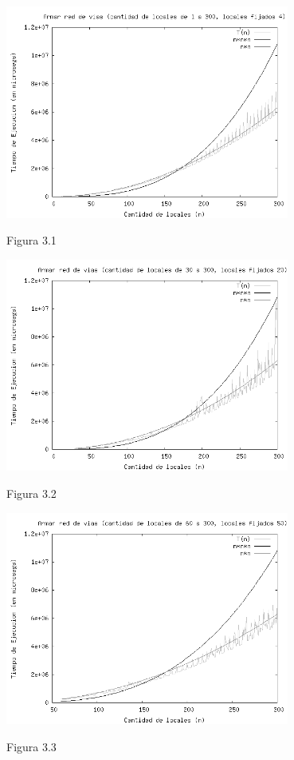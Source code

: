 \documentclass[a4paper,11pt] {article}
\begin{document}
\begin{center}
 \includegraphics[width=0.7\textwidth]{Plots/Tp2Ej3-Complejidad.png}
\begin{center}
Figura 3.1
\end{center}
\end{center}

\begin{center}
 \includegraphics[width=0.7\textwidth]{Plots/Tp2Ej3-Complejidad-20.png}
\begin{center}
Figura 3.2
\end{center}
\end{center}

\begin{center}
 \includegraphics[width=0.7\textwidth]{Plots/Tp2Ej3-Complejidad-50.png}
\begin{center}
Figura 3.3
\end{center}
\end{center}
\end{document}
